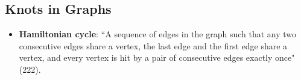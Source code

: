 \documentclass[titlepage]{article}
\numberwithin{figure}{section}
\numberwithin{table}{section}
\numberwithin{equation}{section}
\newcommand{\dq}[2]{``#1" (#2).}
\begin{document}
\subsection{Knots in Graphs}\label{sss:KnotsinGraphs}
\begin{itemize}
    \item \textbf{Hamiltonian cycle}: \dq{A sequence of edges in the graph such that any two consecutive edges share a vertex, the last edge and the first edge share a vertex, and every vertex is hit by a pair of consecutive edges exactly once}{222}
    \begin{figure}[h!]
        \centering
\end{figure}
\end{itemize}
\end{document}
